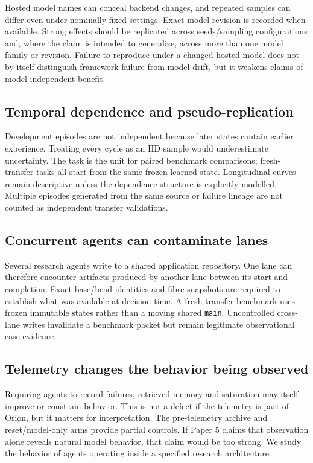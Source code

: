 Hosted model names can conceal backend changes, and repeated samples can differ even under nominally fixed settings. Exact model revision is recorded when available. Strong effects should be replicated across seeds/sampling configurations and, where the claim is intended to generalize, across more than one model family or revision. Failure to reproduce under a changed hosted model does not by itself distinguish framework failure from model drift, but it weakens claims of model-independent benefit.

\subsection{Temporal dependence and pseudo-replication}

Development episodes are not independent because later states contain earlier experience. Treating every cycle as an IID sample would underestimate uncertainty. The task is the unit for paired benchmark comparisons; fresh-transfer tasks all start from the same frozen learned state. Longitudinal curves remain descriptive unless the dependence structure is explicitly modelled. Multiple episodes generated from the same source or failure lineage are not counted as independent transfer validations.

\subsection{Concurrent agents can contaminate lanes}

Several research agents write to a shared application repository. One lane can therefore encounter artifacts produced by another lane between its start and completion. Exact base/head identities and fibre snapshots are required to establish what was available at decision time. A fresh-transfer benchmark uses frozen immutable states rather than a moving shared \texttt{main}. Uncontrolled cross-lane writes invalidate a benchmark packet but remain legitimate observational case evidence.

\subsection{Telemetry changes the behavior being observed}

Requiring agents to record failures, retrieved memory and saturation may itself improve or constrain behavior. This is not a defect if the telemetry is part of Orion, but it matters for interpretation. The pre-telemetry archive and reset/model-only arms provide partial controls. If Paper 5 claims that observation alone reveals natural model behavior, that claim would be too strong. We study the behavior of agents operating inside a specified research architecture.

